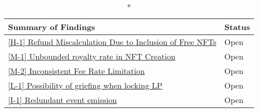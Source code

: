 \begin{longtable}{|p{12cm}|p{3cm}|}
  \caption*{\textbf{Summary of Findings}}
  \hline 
    \multicolumn{1}{|c|}{\textbf{Title}} & \multicolumn{1}{c|}{\textbf{Status}} \\   
  \hline 
\hline\hyperlink{refund-miscalculation-due-to-inclusion-of-free-nfts}{[H-1] Refund Miscalculation Due to Inclusion of Free NFTs} & Open \\
\hline\hyperlink{unbounded-royalty-rate-in-nft-creation}{[M-1]  Unbounded royalty rate in NFT Creation} & Open \\
\hline\hyperlink{inconsistent-fee-rate-limitation}{[M-2] Inconsistent Fee Rate Limitation} & Open \\
\hline\hyperlink{possibility-of-griefing-when-locking-lp}{[L-1] Possibility of griefing when locking LP} & Open \\
\hline\hyperlink{redundant-event-emission}{[I-1] Redundant event emission} & Open \\
\hline
\end{longtable}
